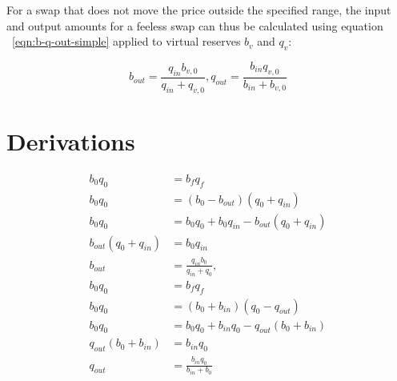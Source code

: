 \documentclass[table, twocolumn]{article}
\begin{document}
For a swap that does not move the price outside the specified range, the input and
output amounts for a feeless swap can thus be calculated using equation
~\ref{eqn:b-q-out-simple} applied to virtual reserves $b_v$ and $q_v$:

\begin{equation}
  b_{out} = \frac{q_{in} b_{v, 0}}{q_{in} + q_{v, 0}},
  q_{out} = \frac{b_{in} q_{v, 0}}{b_{in} + b_{v, 0}}
\end{equation}

\appendix

\section{Derivations}

\begin{align} \label{eqn:b-q-out-simple-derivation}
  b_0 q_0               & = b_f q_f \nonumber                                      \\
  b_0 q_0               & = (b_0 - b_{out})(q_0 + q_{in}) \nonumber                \\
  b_0 q_0               & = b_0 q_0 + b_0 q_{in} - b_{out}(q_0 + q_{in}) \nonumber \\
  b_{out}(q_0 + q_{in}) & = b_{0} q_{in} \nonumber                                 \\
  b_{out}               & = \frac{q_{in} b_0}{q_{in} + q_0}, \nonumber             \\
  b_0 q_0               & = b_f q_f \nonumber                                      \\
  b_0 q_0               & = (b_0 + b_{in})(q_0 - q_{out}) \nonumber                \\
  b_0 q_0               & = b_0 q_0 + b_{in} q_0 - q_{out}(b_0 + b_{in}) \nonumber \\
  q_{out}(b_0 + b_{in}) & = b_{in} q_0 \nonumber                                   \\
  q_{out}               & = \frac{b_{in} q_0}{b_{in} + b_0}
\end{align}
\end{document}
